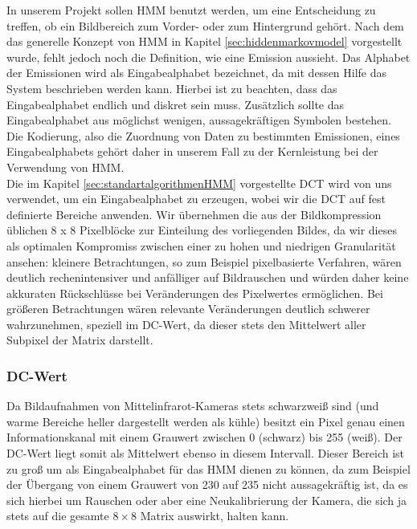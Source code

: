 In unserem Projekt sollen HMM benutzt werden, um eine Entscheidung zu treffen, ob ein Bildbereich zum Vorder- oder zum Hintergrund gehört.
Nach dem das generelle Konzept von HMM in Kapitel \ref{sec:hiddenmarkovmodel} vorgestellt wurde, fehlt jedoch noch die Definition, wie eine Emission aussieht.
Das Alphabet der Emissionen wird als Eingabealphabet bezeichnet, da mit dessen Hilfe das System beschrieben werden kann.
Hierbei ist zu beachten, dass das Eingabealphabet endlich und diskret sein muss.
Zusätzlich sollte das Eingabealphabet aus möglichst wenigen, aussagekräftigen Symbolen bestehen.
Die Kodierung, also die Zuordnung von Daten zu bestimmten Emissionen,  eines Eingabealphabets gehört daher in unserem Fall zu der Kernleistung bei der Verwendung von HMM.\\
Die im Kapitel \ref{sec:standartalgorithmenHMM} vorgestellte DCT wird von uns verwendet, um ein Eingabealphabet zu erzeugen, wobei wir die DCT auf fest definierte Bereiche anwenden.
 Wir übernehmen die aus der Bildkompression üblichen 8 x 8 Pixelblöcke zur Einteilung des vorliegenden Bildes, da wir dieses als optimalen Kompromiss zwischen einer zu hohen und niedrigen Granularität ansehen: kleinere Betrachtungen, so zum Beispiel pixelbasierte Verfahren, wären deutlich rechenintensiver und anfälliger auf Bildrauschen und würden daher keine akkuraten Rückschlüsse bei Veränderungen des Pixelwertes ermöglichen.
 Bei größeren Betrachtungen wären relevante Veränderungen deutlich schwerer wahrzunehmen, speziell im DC-Wert, da dieser stets den Mittelwert aller Subpixel der Matrix darstellt.


\subsubsection{DC-Wert}

Da Bildaufnahmen von Mittelinfrarot-Kameras stets schwarzweiß sind (und warme Bereiche heller dargestellt werden als kühle) besitzt ein Pixel genau einen Informationskanal mit einem Grauwert zwischen 0 (schwarz) bis 255 (weiß).
Der DC-Wert liegt somit als Mittelwert ebenso in diesem Intervall.
Dieser Bereich ist zu groß um als Eingabealphabet für das HMM dienen zu können, da zum Beispiel der Übergang von einem Grauwert von 230 auf 235 nicht aussagekräftig ist, da es sich hierbei um Rauschen oder aber eine Neukalibrierung der Kamera, die sich ja stets auf die gesamte $8 \times 8$ Matrix auswirkt, halten kann.\\


